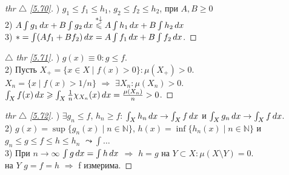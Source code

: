
\begin{minipage}[t]{0.45\textwidth}
\begin{proof}[
thr $\triangle$
\eqref{5.70}]

\phantom{42}

) $g_1 \leq f_1 \leq h_1$, $g_2 \leq f_2 \leq h_2$, при $A, B \geq 0$ \\
2) $A \int g_1 \, d x + B \int g_2 \, d x \overset{*\downarrow}{\leqslant}
A \int h_1 \, d x + B \int h_2 \, d x $ \\
3) $* = \int(Af_1 + B f_2) \, d x = A\int f_1 \, d x + B \int f_2 \, d x$.
\end{proof}
\end{minipage}
\hfill
\begin{minipage}[t]{0.47\textwidth}
\begin{proof}[
 $\triangle$
thr \eqref{5.71}]

\phantom{42}

) $g(x) \equiv 0 \colon g \leq f$. \\
2) Пусть $X_{+} = \{x \in X \mid f(x) > 0\} \colon \mu(X_+) > 0$. \\
$X_n = \{x \mid f(x) > 1/n\}$ $\Rightarrow$ $\exists X_n \colon \mu(X_n) > 0$. \\
$\int_X f(x) \, d x \geqslant \int_X \frac{1}{n} \chi_{X_n} (x) \, d x = \frac{\mu(X_n)}{n} > 0$.
\end{proof}
\end{minipage}


\begin{minipage}[t]{0.9\textwidth}
\begin{proof}[
    thr $\triangle$
    \eqref{5.72}]

    \phantom{42}

    ) $\exists g_n \leq f$, $h_n \geq f$: $\int_X h_n \, d x \to \int_X f \, d x$ и $\int_X g_n \, d x \to \int_X f \, d x$. \\
    2) $g(x) = \sup\{ g_n(x) \mid n \in \mathbb{N}\}$, 
    $h(x) = \inf\{h_n(x) \mid n \in \mathbb{N}\}$  
    и $g_n \leq g \leq f \leq h \leq h_n$ $\leadsto \int \dots$ \\
    3) При $n \to \infty$ $\int g \, d x = \int h \, d x$ $\Rightarrow$
    $h = g$ на $Y \subset X \colon \mu(X \setminus Y) = 0$. \\
    на $Y$ $g=f=h$ $\Rightarrow$ f измерима.
\end{proof}
\end{minipage}
